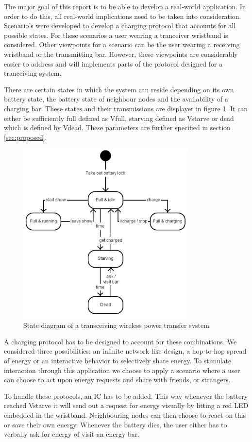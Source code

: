 The major goal of this report is to be able to develop a real-world application. In order to do this, all real-world implications need to be taken into consideration. Scenario's were developed to develop a charging protocol that accounts for all possible states. For these scenarios a user wearing a tranceiver wristband is considered. Other viewpoints for a scenario can be the user wearing a receiving wristband or the transmitting bar. However, these viewpoints are considerably easier to address and will implements parts of the protocol designed for a tranceiving system.

There are certain states in which the system can reside depending on its own battery state, the battery state of neighbour nodes and the availability of a charging bar. These states and their transmissions are displayer in figure \ref{fig:states}. It can either be sufficiently full defined as Vfull, starving defined as Vstarve or dead which is defined by Vdead. These parameters are further specified in section \ref{sec:proposed}.

\begin{figure}[h!]
\centering
\includegraphics[width=0.8\textwidth]{images/statediagram}
\caption{State diagram of a transceiving wireless power transfer system}
\label{fig:states}
\end{figure}

A charging protocol has to be designed to account for these combinations. We considered three possibilities: an infinite network like design, a hop-to-hop spread of energy or an interactive behavior to selectively share energy. To stimulate interaction through this application we choose to apply a scenario where a user can choose to act upon energy requests and share with friends, or strangers.

To handle these protocols, an IC has to be added. This way whenever the battery reached Vstarve it will send out a request for energy visually by litting a red LED embedded in the wristband. Neighbouring nodes can then choose to react on this or save their own energy. Whenever the battery dies, the user either has to verbally ask for energy of visit an energy bar.

